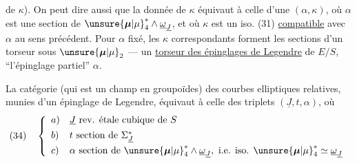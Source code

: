 
de $\kappa$). On peut dire aussi que la donnée de $\kappa$ équivaut à celle d'une  $(\alpha,\kappa)$, où $\alpha$ est une section de $\unsure{\boldsymbol{\mu}|\mu}_4^*\wedge\underline{\omega}_{\underline{J}}$, et où $\kappa$ est un iso. (31) \uline{compatible} avec $\alpha$ au sens précédent. Pour $\alpha$ fixé, les $\kappa$ correspondants forment les sections d'un torseur sous $\unsure{\boldsymbol{\mu}|\mu}_2$ --- un \uline{torseur des épinglages de Legendre} de $E/S$,  ``l'épinglage partiel'' $\alpha$.

La catégorie (qui est un champ en groupoïdes) des courbes elliptiques relatives, munies d'un épinglage de Legendre, équivaut à celle des triplets $(\underline{J},t,\alpha)$, où
\[
(34)\quad\left\{\begin{array}{ll}
a)&\underline{J}\text{ rev. étale cubique de }S\\[4pt]
b)&t\text{ section de }\Sigma_{\underline{J}}^*\\[4pt]
c)&\alpha\text{ section de }\unsure{\boldsymbol{\mu}|\mu}_4^*\wedge\underline{\omega}_{\underline{J}},\ \text{i.e. iso. }\unsure{\boldsymbol{\mu}|\mu}_4^*\simeq\underline{\omega}_{\underline{J}}
\end{array}\right.
\]
